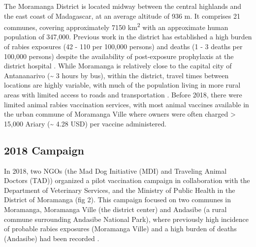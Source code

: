 \documentclass[tropicalmed,article,submit,moreauthors,pdftex]{mdpi}
\begin{document}
The Moramanga District is located midway between the central highlands
and the east coast of Madagascar, at an average altitude of 936 m. It
comprises 21 communes, covering approximately 7150 km\textsuperscript{2}
with an approximate human population of 347,000\citep{instat2021}.
Previous work in the district has established a high burden of rabies
exposures (42 - 110 per 100,000 persons) and deaths (1 - 3 deaths per
100,000 persons) despite the availability of post-exposure prophylaxis
at the district hospital \citep{rajeev2018}. While Moramanga is
relatively close to the capital city of Antananarivo (\textasciitilde{}
3 hours by bus), within the district, travel times between locations are
highly variable, with much of the population living in more rural areas
with limited access to roads and transportation \citep{rajeev2020}.
Before 2018, there were limited animal rabies vaccination services, with
most animal vaccines available in the urban commune of Moramanga Ville
where owners were often charged \textgreater{} 15,000 Ariary
(\textasciitilde{} 4.28 USD) per vaccine administered.

\hypertarget{campaign}{%
\subsection{2018 Campaign}\label{campaign}}

In 2018, two NGOs (the Mad Dog Initiative (MDI) and Traveling Animal
Doctors (TAD)) organized a pilot vaccination campaign in collaboration
with the Department of Veterinary Services, and the Ministry of Public
Health in the District of Moramanga (fig 2). This campaign focused on
two communes in Moramanga, Moramanga Ville (the district center) and
Andasibe (a rural commune surrounding Andasibe National Park), where
previously high incidence of probable rabies exposures (Moramanga Ville)
and a high burden of deaths (Andasibe) had been recorded
\citep{rajeev2018}.
\end{document}
